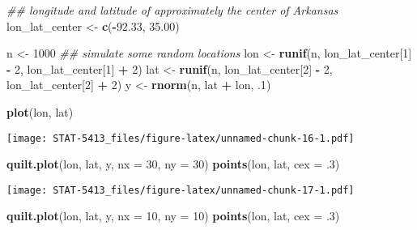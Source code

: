 \documentclass[]{book}
\newenvironment{Shaded}{\begin{snugshade}}{\end{snugshade}}
\newcommand{\CommentTok}[1]{\textcolor[rgb]{0.56,0.35,0.01}{\textit{#1}}}
\newcommand{\DataTypeTok}[1]{\textcolor[rgb]{0.13,0.29,0.53}{#1}}
\newcommand{\DecValTok}[1]{\textcolor[rgb]{0.00,0.00,0.81}{#1}}
\newcommand{\FloatTok}[1]{\textcolor[rgb]{0.00,0.00,0.81}{#1}}
\newcommand{\KeywordTok}[1]{\textcolor[rgb]{0.13,0.29,0.53}{\textbf{#1}}}
\newcommand{\NormalTok}[1]{#1}
\newcommand{\OperatorTok}[1]{\textcolor[rgb]{0.81,0.36,0.00}{\textbf{#1}}}
\newcommand{\StringTok}[1]{\textcolor[rgb]{0.31,0.60,0.02}{#1}}
\begin{document}
\begin{Shaded}
\begin{Highlighting}[]
\CommentTok{## longitude and latitude of approximately the center of Arkansas}
\NormalTok{lon_lat_center <-}\StringTok{ }\KeywordTok{c}\NormalTok{(}\OperatorTok{-}\FloatTok{92.33}\NormalTok{, }\FloatTok{35.00}\NormalTok{) }

\NormalTok{n   <-}\StringTok{ }\DecValTok{1000}
\CommentTok{## simulate some random locations}
\NormalTok{lon  <-}\StringTok{ }\KeywordTok{runif}\NormalTok{(n, lon_lat_center[}\DecValTok{1}\NormalTok{] }\OperatorTok{-}\StringTok{ }\DecValTok{2}\NormalTok{, lon_lat_center[}\DecValTok{1}\NormalTok{] }\OperatorTok{+}\StringTok{ }\DecValTok{2}\NormalTok{)}
\NormalTok{lat  <-}\StringTok{ }\KeywordTok{runif}\NormalTok{(n, lon_lat_center[}\DecValTok{2}\NormalTok{] }\OperatorTok{-}\StringTok{ }\DecValTok{2}\NormalTok{, lon_lat_center[}\DecValTok{2}\NormalTok{] }\OperatorTok{+}\StringTok{ }\DecValTok{2}\NormalTok{)}
\NormalTok{y   <-}\StringTok{ }\KeywordTok{rnorm}\NormalTok{(n, lat }\OperatorTok{+}\StringTok{ }\NormalTok{lon, }\FloatTok{.1}\NormalTok{)}

\KeywordTok{plot}\NormalTok{(lon, lat)}
\end{Highlighting}
\end{Shaded}

\texttt{[image: STAT-5413\_files/figure-latex/unnamed-chunk-16-1.pdf]}

\begin{Shaded}
\begin{Highlighting}[]
\KeywordTok{quilt.plot}\NormalTok{(lon, lat, y, }\DataTypeTok{nx =} \DecValTok{30}\NormalTok{, }\DataTypeTok{ny =} \DecValTok{30}\NormalTok{)}
\KeywordTok{points}\NormalTok{(lon, lat, }\DataTypeTok{cex =} \FloatTok{.3}\NormalTok{)}
\end{Highlighting}
\end{Shaded}

\texttt{[image: STAT-5413\_files/figure-latex/unnamed-chunk-17-1.pdf]}

\begin{Shaded}
\begin{Highlighting}[]
\KeywordTok{quilt.plot}\NormalTok{(lon, lat, y, }\DataTypeTok{nx =} \DecValTok{10}\NormalTok{, }\DataTypeTok{ny =} \DecValTok{10}\NormalTok{)}
\KeywordTok{points}\NormalTok{(lon, lat, }\DataTypeTok{cex =} \FloatTok{.3}\NormalTok{)}
\end{Highlighting}
\end{Shaded}
\end{document}
